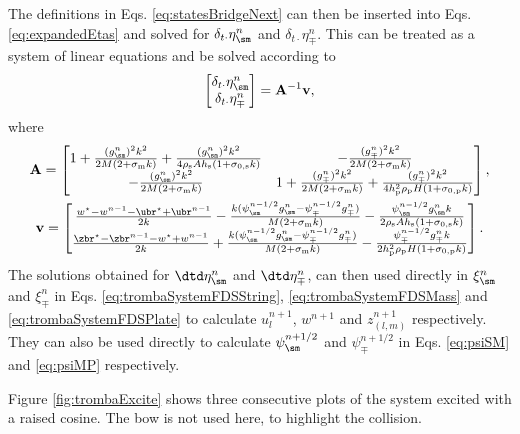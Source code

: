 The definitions in Eqs. \eqref{eq:statesBridgeNext} can then be inserted into Eqs. \eqref{eq:expandedEtas} and solved for $\delta_{t\cdot}\eta_\sm^n$ and $\delta_{t\cdot}\eta_\mp^n$. This can be treated as a system of linear equations and be solved according to
\begin{equation}
    \begin{bmatrix}
        \delta_{t\cdot}\eta_\sm^n\\
        \delta_{t\cdot}\eta_\mp^n
    \end{bmatrix}
    = 
    \mathbf{A}^{-1}\mathbf{v},
\end{equation}
where
\begin{equation}
\begin{gathered}
\mathbf{A} = 
    \begin{bmatrix}
        1 + \frac{(g_\sm^n)^2k^2}{2M(2+\sigma_\text{m}k)} + \frac{(g_\sm^n)^2k^2}{4\rho_\text{s}Ah_\text{s}(1+\sigma_{0,\text{s}}k)} & -\frac{(g_\mp^n)^2k^2}{2M(2+\sigma_\text{m}k)} \\
        -\frac{(g_\sm^n)^2k^2}{2M(2+\sigma_\text{m}k)} & 1+\frac{(g_\mp^n)^2k^2}{2M(2+\sigma_\text{m}k)}+\frac{(g_\mp^n)^2k^2}{4h_\text{p}^2\rho_\text{p}H(1+\sigma_{0,\text{p}}k)}
    \end{bmatrix}
    ,\\
    \mathbf{v} = 
    \begin{bmatrix}
        \frac{w^\star-w^{n-1}-\ubr^\star+\ubr^{n-1}}{2k} - \frac{k(\psi_\sm^{n-1/2}g_\sm^n-\psi_\mp^{n-1/2}g_\mp^n)}{M(2+\sigma_\text{m}k)}-\frac{\psi_\sm^{n-1/2}g_\sm^nk}{2\rho_\text{s}Ah_\text{s}(1+\sigma_{0,\text{s}}k)}\\
        \frac{\zbr^\star-\zbr^{n-1}-w^\star+w^{n-1}}{2k}+\frac{k(\psi_\sm^{n-1/2}g_\sm^n-\psi_\mp^{n-1/2}g_\mp^n)}{M(2+\sigma_\text{m}k)}-\frac{\psi_\mp^{n-1/2}g_\mp^nk}{2h_\text{p}^2\rho_\text{p}H(1+\sigma_{0,\text{p}}k)}
    \end{bmatrix}.
    \nonumber
\end{gathered}
\end{equation}
The solutions obtained for $\dtd \eta_\sm^n$ and $\dtd \eta_\mp^n$, can then used directly in $\xi_\sm^n$ and $\xi_\mp^n$ in Eqs. \eqref{eq:trombaSystemFDSString}, \eqref{eq:trombaSystemFDSMass} and \eqref{eq:trombaSystemFDSPlate} to calculate $u_l^{n+1}$, $w^{n+1}$ and $z_{(l,m)}^{n+1}$ respectively. They can also be used directly to calculate $\psi^{n+1/2}_\sm$ and $\psi^{n+1/2}_\mp$ in Eqs. \eqref{eq:psiSM} and \eqref{eq:psiMP} respectively.

Figure \ref{fig:trombaExcite} shows three consecutive plots of the system excited with a raised cosine. The bow is not used here, to highlight the collision.

